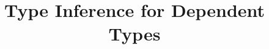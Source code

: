 \documentclass[acmsmall, 10pt, review, dvipsnames]{acmart}
\begin{document}
\title{Type Inference for Dependent Types}






\appendix


\end{document}
